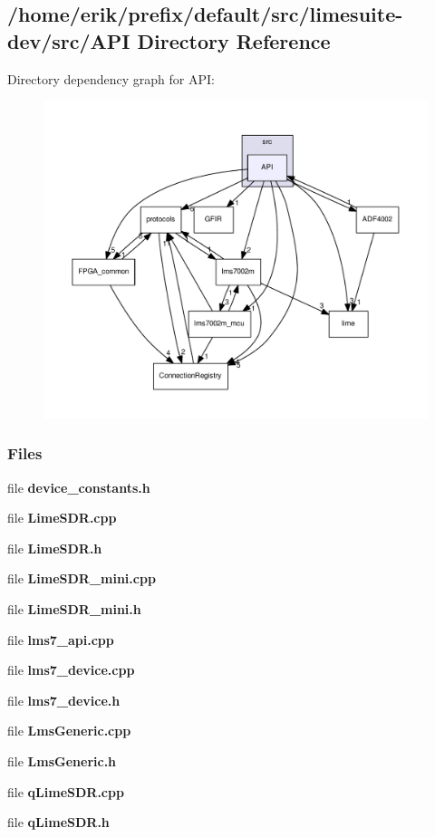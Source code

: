 \subsection{/home/erik/prefix/default/src/limesuite-\/dev/src/\+A\+PI Directory Reference}
\label{dir_aaad4d2b2572c0b533e88e0f12f94a40}
Directory dependency graph for A\+PI\+:
\nopagebreak
\begin{figure}[H]
\begin{center}
\leavevmode
\includegraphics[width=350pt]{dir_aaad4d2b2572c0b533e88e0f12f94a40_dep}
\end{center}
\end{figure}
\subsubsection*{Files}
\begin{DoxyCompactItemize}
\item 
file {\bf device\+\_\+constants.\+h}
\item 
file {\bf Lime\+S\+D\+R.\+cpp}
\item 
file {\bf Lime\+S\+D\+R.\+h}
\item 
file {\bf Lime\+S\+D\+R\+\_\+mini.\+cpp}
\item 
file {\bf Lime\+S\+D\+R\+\_\+mini.\+h}
\item 
file {\bf lms7\+\_\+api.\+cpp}
\item 
file {\bf lms7\+\_\+device.\+cpp}
\item 
file {\bf lms7\+\_\+device.\+h}
\item 
file {\bf Lms\+Generic.\+cpp}
\item 
file {\bf Lms\+Generic.\+h}
\item 
file {\bf q\+Lime\+S\+D\+R.\+cpp}
\item 
file {\bf q\+Lime\+S\+D\+R.\+h}
\end{DoxyCompactItemize}
